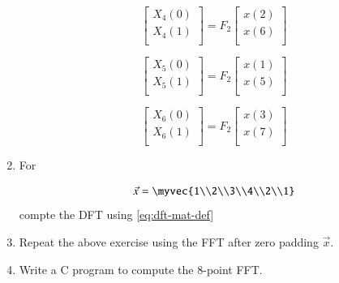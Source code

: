 \documentclass[journal,12pt,twocolumn]{IEEEtran}
\renewcommand\thesection{\arabic{section}}
\begin{document}
\begin{enumerate}[label=\arabic*.,ref=\thesection.\theenumi]
\begin{equation}
\begin{bmatrix}
X_{4}(0) \\ 
X_{4}(1)\\ 
\end{bmatrix}
= F_{2}
\begin{bmatrix}
x(2) \\ 
x(6) \\ 
\end{bmatrix}
\end{equation}

\begin{equation}
\begin{bmatrix}
X_{5}(0) \\ 
X_{5}(1)\\ 
\end{bmatrix}
= F_{2}
\begin{bmatrix}
x(1) \\ 
x(5) \\ 
\end{bmatrix}
\end{equation}

\begin{equation}
\begin{bmatrix}
X_{6}(0) \\ 
X_{6}(1)\\ 
\end{bmatrix}
= F_{2}
\begin{bmatrix}
x(3) \\ 
x(7) \\ 
\end{bmatrix}
\end{equation}

\item For 

    \begin{align}
	    \vec{x} = \myvec{1\\2\\3\\4\\2\\1}
        \label{eq:equation1}
    \end{align}
    compte the DFT  
		using 
	    \eqref{eq:dft-mat-def}
    \item Repeat the above exercise using the FFT
	    after zero padding $\vec{x}$.
\item Write a C program to compute the 8-point FFT. 
 \end{enumerate}
\end{document}
